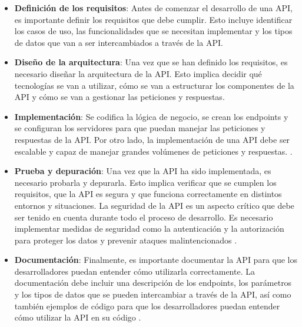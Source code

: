 \begin{itemize}
\item \textbf{Definición de los requisitos}: Antes de comenzar el desarrollo de una API, es importante definir los requisitos que debe cumplir. Esto incluye identificar los casos de uso, las funcionalidades que se necesitan implementar y los tipos de datos que van a ser intercambiados a través de la API.   

\item \textbf{Diseño de la arquitectura}: Una vez que se han definido los requisitos, es necesario diseñar la arquitectura de la API. Esto implica decidir qué tecnologías se van a utilizar, cómo se van a estructurar los componentes de la API y cómo se van a gestionar las peticiones y respuestas.

\item \textbf{Implementación}: Se codifica la lógica de negocio, se crean los endpoints y se configuran los servidores para que puedan manejar las peticiones y respuestas de la API. Por otro lado, la implementación de una API debe ser escalable y capaz de manejar grandes volúmenes de peticiones y respuestas. \cite{art:architectural_styles}.

\item \textbf{Prueba y depuración}: Una vez que la API ha sido implementada, es necesario probarla y depurarla. Esto implica verificar que se cumplen los requisitos, que la API es segura y que funciona correctamente en distintos entornos y situaciones. La seguridad de la API es un aspecto crítico que debe ser tenido en cuenta durante todo el proceso de desarrollo. Es necesario implementar medidas de seguridad como la autenticación y la autorización para proteger los datos y prevenir ataques malintencionados \cite{book:beatiful_code}.

\item \textbf{Documentación}: Finalmente, es importante documentar la API para que los desarrolladores puedan entender cómo utilizarla correctamente. La documentación debe incluir una descripción de los endpoints, los parámetros y los tipos de datos que se pueden intercambiar a través de la API, así como también ejemplos de código para que los desarrolladores puedan entender cómo utilizar la API en su código \cite{book:restful_webservices_richardson}.

\end{itemize}

